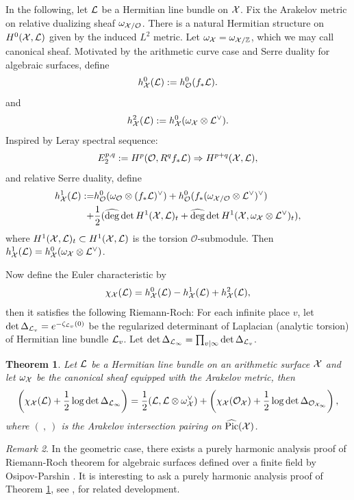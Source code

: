 \documentclass[]{amsart}
\newcommand{\CO}{{\mathcal {O}}} \newcommand{\CP}{{\mathcal {P}}}
\newcommand{\wh}{\widehat}
\theoremstyle{plain}
\newtheorem{thm}{Theorem}[section] \newtheorem{cor}[thm]{Corollary}
\theoremstyle{remark} \newtheorem{remark}[thm]{Remark}
\theoremstyle{remark} \newtheorem{exercise}{Exercise}
\theoremstyle{remark} \newtheorem{example}{Example}
\numberwithin{equation}{section}
\begin{document}
In the following, let ${\mathcal {L}}$ be a Hermitian line bundle on ${\mathcal {X}}$. Fix the Arakelov metric on relative dualizing sheaf $\omega_{\CX/\CO}$. There is a natural Hermitian structure on $H^0({\mathcal {X}},{\mathcal {L}})$ given by the induced $L^2$ metric. Let $\omega_{{\mathcal {X}}}=\omega_{{\mathcal {X}}/{\mathbb {Z}}}$, which we may call canonical sheaf.
Motivated by the arithmetic curve case and Serre duality for algebraic surfaces, define
\[h^0_{\CX}(\CL):=h^0_{\CO}(f_*\CL).\] and \[h^2_{{\mathcal {X}}}({\mathcal {L}}):=h^0_{{\mathcal {X}}}(\omega_{{\mathcal {X}}}\otimes {\mathcal {L}}^\vee).\]
Inspired by Leray spectral sequence: \[E_2^{p,q}:=H^p(\CO,R^qf_* \CL)\Rightarrow H^{p+q}(\CX,\CL),\] and relative Serre duality, define 
 \[\begin{aligned}h_\CX^1(\CL):=&h_\CO^0(\omega_\CO\otimes (f_*\CL)^\vee)+h_\CO^0(f_*(\omega_{\CX/\CO}\otimes\CL^\vee)^\vee)\\
  +&\frac{1}{2}(\wh{\deg}\det H^1(\CX,\CL)_t+\wh{\deg}\det H^1(\CX,\omega_\CX\otimes\CL^{\vee})_t),\\
\end{aligned}\]where $H^1({\mathcal {X}},{\mathcal {L}})_t\subset H^1({\mathcal {X}},{\mathcal {L}})$ is the torsion $\CO$-submodule. Then $h_{\mathcal {X}}^1({\mathcal {L}})=h^0_{{\mathcal {X}}}(\omega_{{\mathcal {X}}}\otimes{\mathcal {L}}^\vee)$.

Now define the Euler characteristic by \[\chi_{{\mathcal {X}}}({\mathcal {L}})=h^0_{{\mathcal {X}}}({\mathcal {L}})-h^1_{{\mathcal {X}}}({\mathcal {L}})+h^2_{{\mathcal {X}}}({\mathcal {L}}),\] then it satisfies the following Riemann-Roch:
For each infinite place $v$, let $\det \Delta_{{\mathcal {L}}_v}=e^{-\zeta_{{\mathcal {L}}_v}(0)}$ be the regularized determinant of Laplacian (analytic torsion) of Hermitian line bundle ${\mathcal {L}}_v$.  Let $\det \Delta_{{\mathcal {L}}_\infty}=\prod_{v|\infty}\det \Delta_{{\mathcal {L}}_v}$.

\begin{thm}\label{main1}Let ${\mathcal {L}}$ be a Hermitian line bundle on an arithmetic surface ${\mathcal {X}}$ and let $\omega_{{\mathcal {X}}}$ be the canonical sheaf equipped with the Arakelov metric, then
\[\left(\chi_\CX(\CL)+\frac{1}{2}\log \det \Delta_{\CL_\infty}\right)=\frac{1}{2}(\CL,\CL\otimes \omega_{\CX}^\vee)+\left(\chi_\CX(\CO_{\CX})+\frac{1}{2}\log \det\Delta_{\CO_{\CX_\infty}}\right),\]where $(\ ,\ )$ is the Arakelov intersection pairing on $\wh{\Pic}(\CX)$.
\end{thm} 

\begin{remark}
In the geometric case, there exists a purely harmonic analysis proof of Riemann-Roch theorem for algebraic surfaces defined over a finite field by Osipov-Parshin \cite{Osipov-Parshin:2011I}. It is interesting to ask a purely harmonic analysis proof of Theorem \ref{main1}, see \cite{Parshin:2011}, \cite{Osipov-Parshin:2011II} for related development.
\end{remark}
\end{document}

